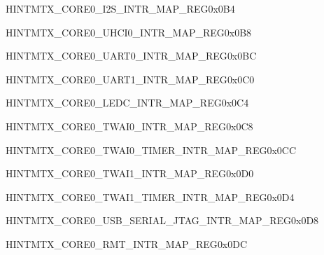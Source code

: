 \begin{register}{H}{INTMTX\_CORE0\_I2S\_INTR\_MAP\_REG}{0x0B4}\label{regdesc:INTMTXCORE0I2SINTRMAPREG} \end{register}\vspace{-3em}
\begin{register}{H}{INTMTX\_CORE0\_UHCI0\_INTR\_MAP\_REG}{0x0B8}\label{regdesc:INTMTXCORE0UHCI0INTRMAPREG} \end{register}\vspace{-3em}
\begin{register}{H}{INTMTX\_CORE0\_UART0\_INTR\_MAP\_REG}{0x0BC}\label{regdesc:INTMTXCORE0UART0INTRMAPREG} \end{register}\vspace{-3em}
\begin{register}{H}{INTMTX\_CORE0\_UART1\_INTR\_MAP\_REG}{0x0C0}\label{regdesc:INTMTXCORE0UART1INTRMAPREG} \end{register}\vspace{-3em}
\begin{register}{H}{INTMTX\_CORE0\_LEDC\_INTR\_MAP\_REG}{0x0C4}\label{regdesc:INTMTXCORE0LEDCINTRMAPREG} \end{register}\vspace{-3em}
\begin{register}{H}{INTMTX\_CORE0\_TWAI0\_INTR\_MAP\_REG}{0x0C8}\label{regdesc:INTMTXCORE0TWAI0INTRMAPREG} \end{register}\vspace{-3em}
\begin{register}{H}{INTMTX\_CORE0\_TWAI0\_TIMER\_INTR\_MAP\_REG}{0x0CC}\label{regdesc:INTMTXCORE0TWAI0TIMERINTRMAPREG} \end{register}\vspace{-3em}
\begin{register}{H}{INTMTX\_CORE0\_TWAI1\_INTR\_MAP\_REG}{0x0D0}\label{regdesc:INTMTXCORE0TWAI1INTRMAPREG} \end{register}\vspace{-3em}
\begin{register}{H}{INTMTX\_CORE0\_TWAI1\_TIMER\_INTR\_MAP\_REG}{0x0D4}\label{regdesc:INTMTXCORE0TWAI1TIMERINTRMAPREG} \end{register}\vspace{-3em}
\begin{register}{H}{INTMTX\_CORE0\_USB\_SERIAL\_JTAG\_INTR\_MAP\_REG}{0x0D8}\label{regdesc:INTMTXCORE0USBSERIALJTAGINTRMAPREG} \end{register}\vspace{-3em}
\begin{register}{H}{INTMTX\_CORE0\_RMT\_INTR\_MAP\_REG}{0x0DC}\label{regdesc:INTMTXCORE0RMTINTRMAPREG} \end{register}\vspace{-3em}
